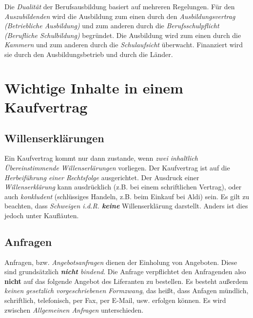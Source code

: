 \documentclass[a4paper, 12pt]{report}
\begin{document}
Die \emph{Dualität} der Berufsausbildung basiert auf mehreren Regelungen. Für 
den \emph{Auszubildenden} wird die Ausbildung zum einen durch den 
\emph{Ausbildungsvertrag (Betriebliche Ausbildung)} und zum anderen durch die 
\emph{Berufsschulpflicht (Berufliche Schulbildung)} begründet. Die Ausbildung
wird zum einen durch die \emph{Kammern} und zum anderen durch die 
\emph{Schulaufsicht} überwacht. Finanziert wird sie durch den Ausbildungsbetrieb
und durch die Länder. 




\section{Wichtige Inhalte in einem Kaufvertrag}

\subsection{Willenserklärungen}

Ein Kaufvertrag kommt nur dann zustande, wenn \emph{zwei inhaltlich 
Übereinstimmende Willenserlärungen} vorliegen. Der Kaufvertrag ist auf die 
\emph{Herbeiführung einer Rechtsfolge} ausgerichtet. Der Ausdruck einer 
\emph{Willenserklärung} kann ausdrücklich (z.B. bei einem schriftlichen 
Vertrag), oder auch \emph{konkludent} (schlüssiges Handeln, z.B. beim Einkauf 
bei Aldi) sein. Es gilt zu beachten, dass \emph{Schweigen i.d.R. \textbf{keine}}
Willenserklärung darstellt. Anders ist dies jedoch unter Kaufläuten. \\

\subsection{Anfragen}

Anfragen, bzw. \emph{Angebotsanfragen} dienen der Einholung von Angeboten. Diese
sind grundsätzlich \emph{\textbf{nicht} bindend}. Die Anfrage verpflichtet den 
Anfragenden also \textbf{nicht} auf das folgende Angebot des Liferanten zu 
bestellen. Es besteht außerdem \emph{keinen gesetzlich vorgeschriebenen 
Formzwang}, das heißt, dass Anfagen mündlich, schriftlich, telefonisch, per Fax, 
per E-Mail, usw. erfolgen können. Es wird zwischen \emph{Allgemeinen Anfragen} 
unterschieden. \\
\end{document}
